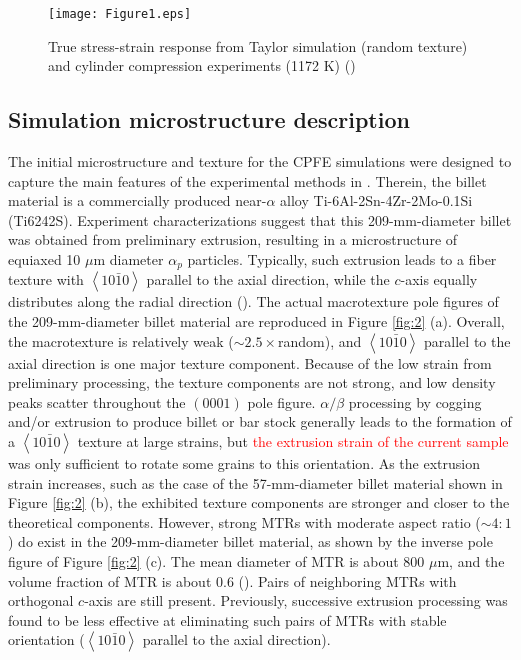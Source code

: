 \documentclass[review]{elsarticle}
\begin{document}
	\begin{figure}[!htb]
	\centering
	\texttt{[image: Figure1.eps]}
	\caption{True stress-strain response from Taylor simulation (random texture) and cylinder compression experiments (1172 K) (\cite{r26})}
	\label{fig:1}
	\end{figure}
	\subsection{Simulation microstructure description}
	The initial microstructure and texture for the CPFE simulations were designed to capture the main features of the experimental methods in \cite{r26}.
	Therein, the billet material is a commercially produced near-$\alpha$ alloy Ti-6Al-2Sn-4Zr-2Mo-0.1Si (Ti6242S).
	Experiment characterizations suggest that this 209-mm-diameter billet was obtained from preliminary extrusion, resulting in a microstructure of equiaxed 10 $\mu$m diameter $\alpha_p$ particles.
	Typically, such extrusion leads to a fiber texture with $\left< 10\bar{1}0 \right>$ parallel to the axial direction, while the $c$-axis equally distributes along the radial direction (\cite{r5}).
	The actual macrotexture pole figures of the 209-mm-diameter billet material are reproduced in Figure \ref{fig:2} (a).
	Overall, the macrotexture is relatively weak ($\sim 2.5 \times$random), and $\left< 10\bar{1}0 \right>$ parallel to the axial direction is one major texture component.
	Because of the low strain from preliminary processing, the texture components are not strong, and low density peaks scatter throughout the $(0001)$ pole figure.
	$\alpha/\beta$ processing by cogging and/or extrusion to produce billet or bar stock generally leads to the formation of a $\left< 10\bar{1}0 \right>$ texture at large strains, but \textcolor{red}{the extrusion strain of the current sample} was only sufficient to rotate some grains to this orientation.
	As the extrusion strain increases, such as the case of the 57-mm-diameter billet material shown in Figure \ref{fig:2} (b), the exhibited texture components are stronger and closer to the theoretical components.
	However, strong MTRs with moderate aspect ratio ($\sim 4:1$) do exist in the 209-mm-diameter billet material, as shown by the inverse pole figure of Figure \ref{fig:2} (c).
	The mean diameter of MTR is about 800 $\mu$m, and the volume fraction of MTR is about 0.6 (\cite{r5}).
	Pairs of neighboring MTRs with orthogonal $c$-axis are still present.
	Previously, successive extrusion processing was found to be less effective at eliminating such pairs of MTRs with stable orientation ($\left< 10\bar{1}0 \right>$ parallel to the axial direction).
\end{document}
